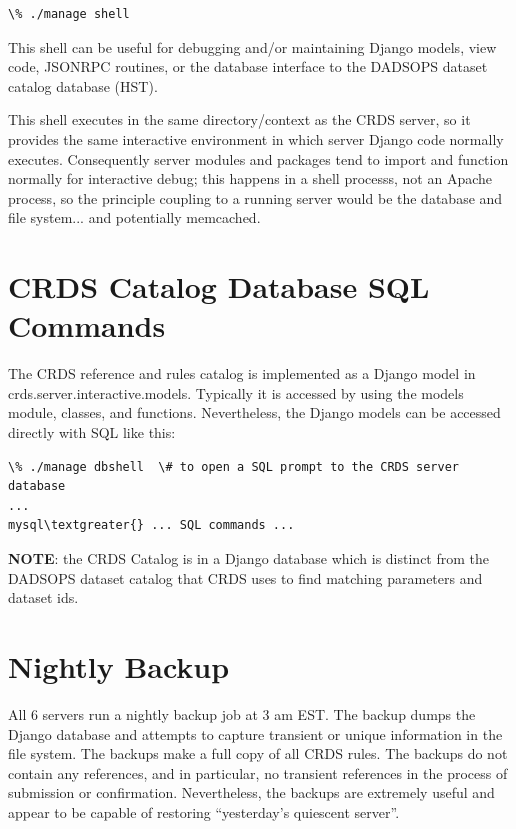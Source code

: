 \documentclass[letterpaper,10pt,english]{sphinxmanual}
\begin{document}
\begin{Verbatim}[commandchars=\\\{\}]
\% ./manage shell
\end{Verbatim}

This shell can be useful for debugging and/or maintaining Django models, view code, JSONRPC routines, or
the database interface to the DADSOPS dataset catalog database (HST).

This shell executes in the same directory/context as the CRDS server,  so it provides the same interactive
environment in which server Django code normally executes.   Consequently server modules and packages tend to
import and function normally for interactive debug;  this happens in a shell processs,  not an Apache process,
so the principle coupling to a running server would be the database and file system... and potentially memcached.


\section{CRDS Catalog Database SQL Commands}
\label{server_guide:crds-catalog-database-sql-commands}
The CRDS reference and rules catalog is implemented as a Django model in crds.server.interactive.models.  Typically
it is accessed by using the models module, classes, and functions.  Nevertheless,  the Django models can be accessed
directly with SQL like this:

\begin{Verbatim}[commandchars=\\\{\}]
\% ./manage dbshell  \# to open a SQL prompt to the CRDS server database
...
mysql\textgreater{} ... SQL commands ...
\end{Verbatim}

\textbf{NOTE}:  the CRDS Catalog is in a Django database which is distinct from the DADSOPS dataset catalog that
CRDS uses to find matching parameters and dataset ids.


\section{Nightly Backup}
\label{server_guide:nightly-backup}
All 6 servers run a nightly backup job at 3 am EST.   The backup dumps the Django database and attempts to capture
transient or unique information in the file system.   The backups make a full copy of all CRDS rules.   The backups
do not contain any references,  and in particular,  no transient references in the process of submission or
confirmation.   Nevertheless,  the backups are extremely useful and appear to be capable of restoring
``yesterday's quiescent server''.
\end{document}
